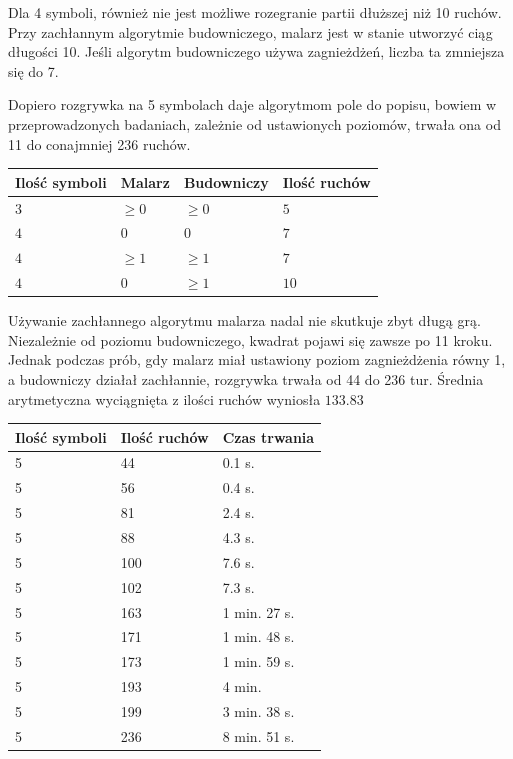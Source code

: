 \documentclass[document]{xmgr}
\begin{document}
Dla 4 symboli, również nie jest możliwe rozegranie partii dłuższej niż 10 ruchów. Przy zachłannym algorytmie budowniczego, malarz jest w stanie utworzyć ciąg długości 10. Jeśli algorytm budowniczego używa zagnieżdżeń, liczba ta zmniejsza się do 7.

Dopiero rozgrywka na 5 symbolach daje algorytmom pole do popisu, bowiem w przeprowadzonych badaniach, zależnie od ustawionych poziomów, trwała ona od 11 do conajmniej 236 ruchów.

\begin{table}[!h]
\begin{tabular}{|l|l|l|l|} \hline
Ilość symboli & Malarz & Budowniczy & Ilość ruchów \\ \hline
$3$ & $\geq 0$ & $\geq 0$ & $5$\\ \hline
$4$ & $0$ & $0$ & $7$\\ \hline
$4$ & $\geq 1 $ & $\geq 1$ & $7$\\ \hline
$4$ & $0$ & $\geq 1$ & $10$\\ \hline
\end{tabular}
\end{table}

\hfill \break
Używanie zachłannego algorytmu malarza nadal nie skutkuje zbyt długą grą. Niezależnie od poziomu budowniczego, kwadrat pojawi się zawsze po 11 kroku. Jednak podczas prób, gdy malarz miał ustawiony poziom zagnieżdżenia równy 1, a budowniczy działał zachłannie, rozgrywka trwała od 44 do 236 tur. Średnia arytmetyczna wyciągnięta z ilości ruchów wyniosła $133.83$

\begin{table}[!h]
\begin{tabular}{|l|l|l|} \hline
Ilość symboli & Ilość ruchów & Czas trwania \\ \hline
5 & 44 & 0.1 s.\\ \hline
5 & 56 & 0.4 s.\\ \hline
5 & 81 & 2.4 s.\\ \hline
5 & 88 & 4.3 s.\\ \hline
5 & 100 & 7.6 s.\\ \hline
5 & 102 & 7.3 s.\\ \hline
5 & 163 & 1 min. 27 s. \\ \hline
5 & 171 & 1 min. 48 s. \\ \hline
5 & 173 & 1 min. 59 s. \\ \hline
5 & 193 & 4 min. \\ \hline
5 & 199 & 3 min. 38 s.\\ \hline
5 & 236 & 8 min. 51 s. \\ \hline
\end{tabular}
\end{table}
\end{document}
